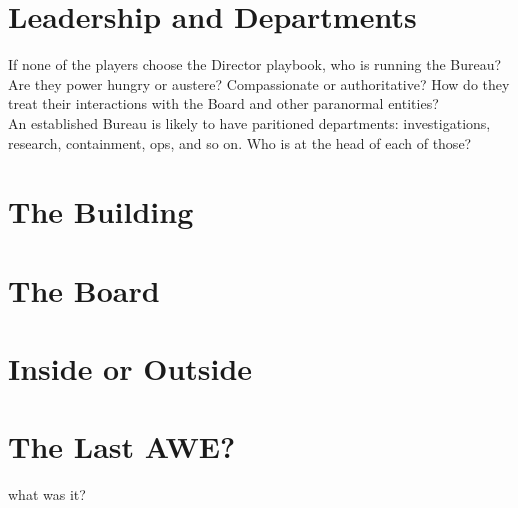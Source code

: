 \documentclass[10pt,oneside,landscape]{memoir}
\begin{document}
\begin{multicols}{2}
\section*{Leadership and Departments}
If none of the players choose the Director playbook, who is running the Bureau?  Are they power hungry or austere?  Compassionate or authoritative?  How do they treat their interactions with the Board and other paranormal entities?
\\[4mm]
An established Bureau is likely to have paritioned departments: investigations, research, containment, ops, and so on.  Who is at the head of each of those?  
\section*{The Building}
\section*{The Board}
\section*{Inside or Outside}
\section*{The Last AWE?}
what was it?
\end{multicols}
\pagebreak
%
%
\end{document}
